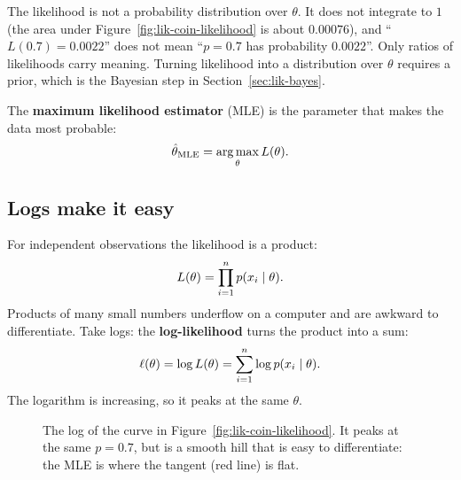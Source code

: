 \begin{trapbox}
The likelihood is not a probability distribution over $\theta$. It does not integrate
to $1$ (the area under Figure~\ref{fig:lik-coin-likelihood} is about $0.00076$), and
``$L(0.7)=0.0022$'' does not mean ``$p=0.7$ has probability $0.0022$''. Only ratios
of likelihoods carry meaning. Turning likelihood into a distribution over $\theta$
requires a prior, which is the Bayesian step in Section~\ref{sec:lik-bayes}.
\end{trapbox}

The \textbf{maximum likelihood estimator} (MLE) is the parameter that makes the data
most probable:
\[
  \hat\theta_{\text{MLE}} = \operatorname*{arg\,max}_\theta L(\theta).
\]

\subsection{Logs make it easy}

For independent observations the likelihood is a product:
\[
  L(\theta) = \prod_{i=1}^n p(x_i\mid\theta) .
\]
Products of many small numbers underflow on a computer and are awkward to differentiate. Take logs: the \textbf{log-likelihood} turns the product into a sum:
\[
  \ell(\theta) = \log L(\theta) = \sum_{i=1}^n \log p(x_i\mid\theta) .
\]
The logarithm is increasing, so it peaks at the same $\theta$.

\begin{figure}[H]
\centering
{}
\caption{The log of the curve in Figure~\ref{fig:lik-coin-likelihood}. It peaks at the
same $p=0.7$, but is a smooth hill that is easy to differentiate: the MLE is where the
tangent (red line) is flat.}
\label{fig:lik-coin-loglik}
\end{figure}

